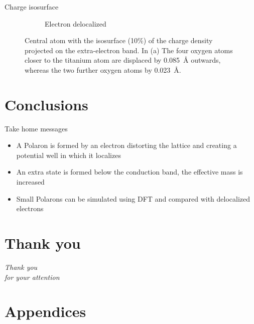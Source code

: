 \documentclass[11pt, xcolor=dvipsnames, aspectratio=43]{beamer}
\begin{document}
\begin{frame}{Charge isosurface}
\begin{figure}[p]
\begin{subfigure}[b]{0.49\textwidth}
            \caption{Electron delocalized}
            \label{fig:delocalized_iso}
        \end{subfigure}
        \caption{Central atom with the isosurface  (10\%) of the charge density projected on the extra-electron band. In (a) The four oxygen atoms closer to the titanium atom are displaced by \SI{0.085}{\angstrom} outwards, whereas the two further oxygen atoms by \SI{0.023}{\angstrom}.}
        \label{fig:isosurfaces_center}
    \end{figure}
\end{frame}

\section{Conclusions}
\begin{frame}{Take home messages}
    \begin{itemize}
        \item<1-> A Polaron is formed by an electron \alert{distorting} the lattice and creating a \alert{potential well} in which it \alert{localizes}
        \item<2-> An \alert{extra state} is formed below the conduction band, the effective mass is increased
        \item<3-> Small Polarons can be simulated using \alert{DFT} and compared with delocalized electrons
    \end{itemize}
\end{frame}

\section*{Thank you}
\begin{frame}{}
    \centering \huge
    \emph{\alert{Thank you}\\for your attention}
\end{frame}

\appendix
\section*{Appendices}
\end{document}
